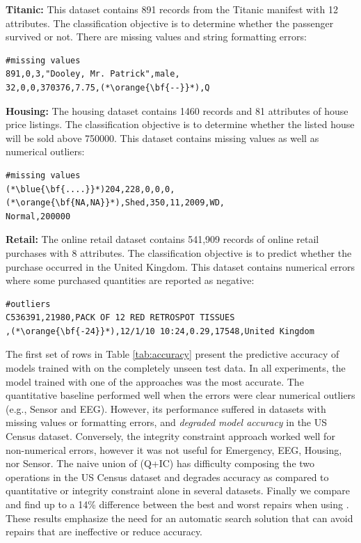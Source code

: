 \vspace{0.5em}\noindent\textbf{Titanic: } This dataset contains 891 records from the Titanic manifest with 12 attributes. The classification objective is to determine whether the passenger survived or not. There are missing values and string formatting errors:

\begin{lstlisting}
#missing values
891,0,3,"Dooley, Mr. Patrick",male,
32,0,0,370376,7.75,(*\orange{\bf{--}}*),Q
\end{lstlisting}

\vspace{0.5em}\noindent\textbf{Housing: } The housing dataset contains 1460 records and 81 attributes of house price listings. The classification objective is to determine whether the listed house will be sold above 750000. 
This dataset contains missing values as well as numerical outliers:
\begin{lstlisting}
#missing values
(*\blue{\bf{....}}*)204,228,0,0,0,(*\orange{\bf{NA,NA}}*),Shed,350,11,2009,WD,
Normal,200000
\end{lstlisting}

\vspace{0.5em}\noindent\textbf{Retail: } The online retail dataset contains 541,909 records of online retail purchases with 8 attributes. The classification objective is to predict whether the purchase occurred in the United Kingdom.
This dataset contains numerical errors where some purchased quantities are reported as negative:
\begin{lstlisting}
#outliers
C536391,21980,PACK OF 12 RED RETROSPOT TISSUES
,(*\orange{\bf{-24}}*),12/1/10 10:24,0.29,17548,United Kingdom
\end{lstlisting}

\vspace{1em}
The first set of rows in Table \ref{tab:accuracy} present the predictive accuracy of models trained with \sys on the completely unseen test data.  In all experiments, the model trained with one of the \sys  approaches was the most accurate.
The quantitative baseline performed well when the errors were clear numerical outliers (e.g., Sensor and  EEG).  However, its performance suffered in datasets with missing values or formatting errors, and {\it degraded model accuracy} in the US Census dataset.
Conversely, the integrity constraint approach worked well for non-numerical errors, however it was not useful for Emergency, EEG, Housing, nor Sensor.
The naive union of (Q+IC) has difficulty composing the two operations in the US Census dataset and degrades accuracy as compared to quantitative or integrity constraint alone in several datasets.  Finally we compare and find up to a 14\% difference between the best and worst repairs when using \sys.  These results emphasize the need for an automatic search solution that can avoid repairs that are ineffective or reduce accuracy.

